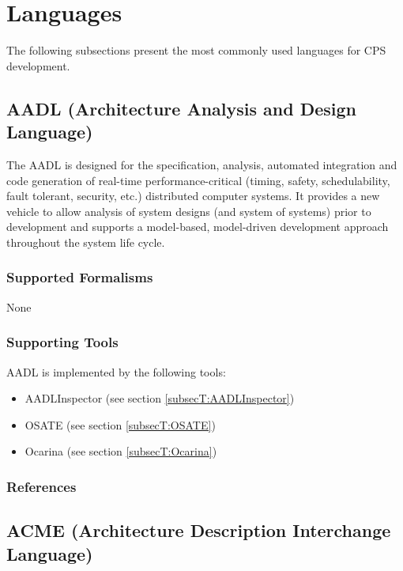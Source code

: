 \section{Languages}
\label{sec:languages}

The following subsections present the most commonly used languages for CPS development.

\subsection{AADL (Architecture Analysis and Design Language)}
\label{subsecL:AADL}


The AADL is designed for the specification, analysis, automated integration and code generation of real-time performance-critical (timing, safety, schedulability, fault tolerant, security, etc.) distributed computer systems. It provides a new vehicle to allow analysis of system designs (and system of systems) prior to development and supports a model-based, model-driven development approach throughout the system life cycle.

\subsubsection{Supported Formalisms}

None


\subsubsection{Supporting Tools}

AADL is implemented by the following tools:
\begin{itemize}
	\item AADLInspector (see section \ref{subsecT:AADLInspector})
	\item OSATE (see section \ref{subsecT:OSATE})
	\item Ocarina (see section \ref{subsecT:Ocarina})
\end{itemize}


\subsubsection{References}





\subsection{ACME (Architecture Description Interchange Language)}
\label{subsecL:ACME}


